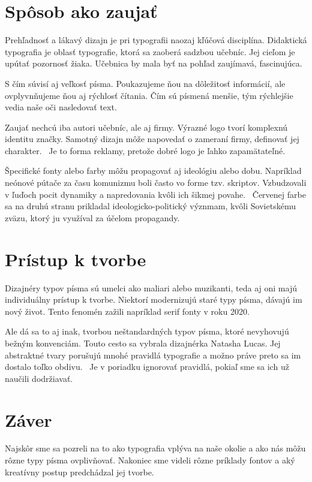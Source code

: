 \documentclass[11pt, a4paper]{article}
\begin{document}
\section*{Spôsob ako zaujať}
Prehľadnosť a lákavý dizajn je pri typografii naozaj kľúčová disciplína. 
Didaktická typografia je oblasť typografie, ktorá sa zaoberá sadzbou učebníc.
Jej cieľom je upútať pozornosť žiaka. Učebnica
by mala byť na pohľad zaujímavá, fascinujúca.~\cite{trousil2015didaktik}\par
S čím súvisí aj veľkosť písma. Poukazujeme ňou na dôležitosť informácií, 
ale ovplyvnňujeme ňou aj rýchlosť čítania.
Čím sú písmená menšie, tým rýchlejšie 
vedia naše oči nasledovať text.~\cite{legge2011size}\par 

Zaujať nechcú iba autori učebníc, ale aj firmy.
Výrazné logo tvorí komplexnú identitu značky.
Samotný dizajn môže napovedať o zameraní firmy, definovať jej charakter.~\cite{fuse}
Je to forma reklamy, pretože dobré logo je ľahko zapamätateľné.\par

Špecifické fonty alebo farby môžu	 propagovať aj ideológiu alebo dobu. 
Napríklad neónové pútače za času komunizmu boli často vo forme tzv. skriptov. 
Vzbudzovali v ľuďoch pocit dynamiky a napredovania kvôli ich šikmej povahe.~\cite{neon}
Červenej farbe sa na druhú stranu prikladal ideologicko-politický význmam, 
kvôli Sovietskému zväzu, ktorý ju využíval za účelom propagandy.~\cite{ideo}

\section*{Prístup k tvorbe}
Dizajnéry typov písma sú umelci ako maliari alebo muzikanti,
teda aj oni majú individuálny prístup k tvorbe. 
Niektorí modernizujú staré typy písma, dávajú im nový život.
Tento fenomén zažili napríklad serif fonty v roku 2020.~\cite{serif}\par
Ale dá sa to aj inak, tvorbou neštandardných typov písma, 
ktoré nevyhovujú bežným konvenciám. 
Touto cesto sa vybrala dizajnérka Natasha Lucas.
Jej abstraktné tvary porušujú mnohé pravidlá typografie
a možno práve preto sa im dostalo toľko obdivu.~\cite{abstract} 
Je v poriadku ignorovať pravidlá, pokiaľ sme sa ich už naučili dodržiavať.

\section*{Záver}
Najskôr sme sa pozreli na to ako typografia vplýva na naše okolie 
a ako nás môžu rôzne typy písma ovplivňovať. 
Nakoniec sme videli rôzne príklady fontov a aký kreatívny postup predchádzal jej tvorbe.


\newpage


\end{document}
